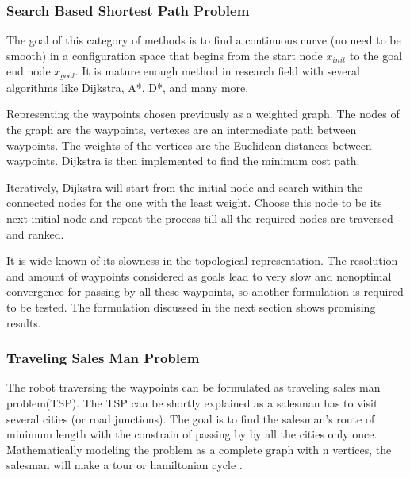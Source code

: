 \subsubsection{Search Based Shortest Path Problem}
The goal of this category of methods is to find a continuous curve (no need to be smooth) in a configuration space that begins from the start node $x_{init}$ to the goal end node $x_{goal}$. It is mature enough method in research field with several algorithms like Dijkstra, A*, D*, and many more. %

Representing the waypoints chosen previously as a weighted graph. The nodes of the graph are the waypoints, vertexes are an intermediate path between waypoints. The weights of the vertices are the Euclidean distances between waypoints. Dijkstra is then implemented to find the minimum cost path.

 Iteratively, Dijkstra will start from the initial node and search within the connected nodes for the one with the least weight. Choose this node to be its next initial node and repeat the process till all the required nodes are traversed and ranked.



It is wide known of its slowness in the topological representation. The resolution and amount of waypoints considered as goals lead to very slow and nonoptimal convergence for passing by all these waypoints, so another formulation is required to be tested. The formulation discussed in the next section shows promising results.

\subsubsection{Traveling Sales Man Problem }
The robot traversing the waypoints can be formulated as traveling sales man problem(TSP). The TSP can be shortly explained as a salesman has to visit several cities (or road junctions). The goal is to find the salesman's route of minimum length with the constrain of passing by by all the cities only once. Mathematically modeling the problem as a complete graph with n vertices, the salesman will make a tour or hamiltonian cycle  \cite{dantzig1954solution}.

